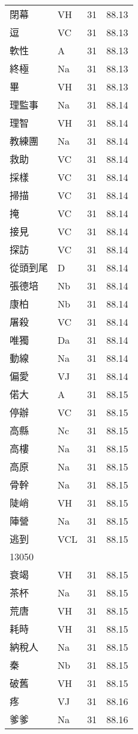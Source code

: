 \documentclass[twocolumn]{book}
\begin{document}
\begin{supertabular}{llrr}
閉幕 & VH & 31 &  88.13\\
逗 & VC & 31 &  88.13\\
軟性 & A & 31 &  88.13\\
終極 & Na & 31 &  88.13\\
畢 & VH & 31 &  88.13\\
理監事 & Na & 31 &  88.14\\
理智 & VH & 31 &  88.14\\
教練團 & Na & 31 &  88.14\\
救助 & VC & 31 &  88.14\\
採樣 & VC & 31 &  88.14\\
掃描 & VC & 31 &  88.14\\
掩 & VC & 31 &  88.14\\
接見 & VC & 31 &  88.14\\
探訪 & VC & 31 &  88.14\\
從頭到尾 & D & 31 &  88.14\\
張德培 & Nb & 31 &  88.14\\
康柏 & Nb & 31 &  88.14\\
屠殺 & VC & 31 &  88.14\\
唯獨 & Da & 31 &  88.14\\
動線 & Na & 31 &  88.14\\
偏愛 & VJ & 31 &  88.14\\
偌大 & A & 31 &  88.15\\
停辦 & VC & 31 &  88.15\\
高縣 & Nc & 31 &  88.15\\
高樓 & Na & 31 &  88.15\\
高原 & Na & 31 &  88.15\\
骨幹 & Na & 31 &  88.15\\
陡峭 & VH & 31 &  88.15\\
陣營 & Na & 31 &  88.15\\
逃到 & VCL & 31 &  88.15\\
13050\\
衰竭 & VH & 31 &  88.15\\
茶杯 & Na & 31 &  88.15\\
荒唐 & VH & 31 &  88.15\\
耗時 & VH & 31 &  88.15\\
納稅人 & Na & 31 &  88.15\\
秦 & Nb & 31 &  88.15\\
破舊 & VH & 31 &  88.15\\
疼 & VJ & 31 &  88.16\\
爹爹 & Na & 31 &  88.16\\

\end{supertabular}
\end{document}
